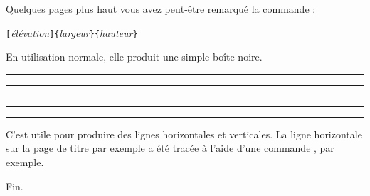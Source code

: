 

Quelques pages plus haut vous avez peut-être remarqué la commande :

\begin{lscommand}
\verb|[|\emph{élévation}\verb|]{|\emph{largeur}\verb|}{|\emph{hauteur}\verb|}|
\end{lscommand}

\noindent En utilisation normale, elle produit une simple boîte
noire.

\begin{example}
\rule{3mm}{.1pt}%
\rule[-1mm]{5mm}{1cm}%
\rule{3mm}{.1pt}%
\rule[1mm]{1cm}{5mm}%
\rule{3mm}{.1pt}
\end{example}

\noindent C'est utile pour produire des lignes horizontales et
verticales. La ligne horizontale sur la page de titre par exemple a
été tracée à l'aide d'une commande , par exemple.

\bigskip
{\flushright Fin.\par}

\endinput

%

